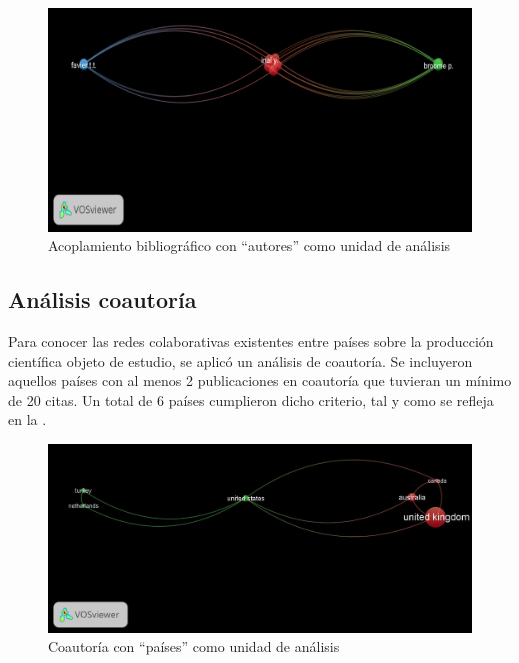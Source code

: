 \documentclass[spanish]{textolivre}
\begin{document}
\begin{figure}[h!]
\centering
\begin{minipage}{.9\textwidth}
 \includegraphics[width=\textwidth]{fig3.png}
 \caption{Acoplamiento bibliográfico con “autores” como unidad de análisis}
 \label{fig3}
\end{minipage}
\end{figure}


\subsection{Análisis coautoría}

Para conocer las redes colaborativas existentes entre países sobre la producción científica objeto de estudio, se aplicó un análisis de coautoría. Se incluyeron aquellos países con al menos 2 publicaciones en coautoría que tuvieran un mínimo de 20 citas. Un total de 6 países cumplieron dicho criterio, tal y como se refleja en la .

\begin{figure}[h!]
\centering
\begin{minipage}{.9\textwidth}
 \includegraphics[width=\textwidth]{fig4.jpg}
 \caption{Coautoría con “países” como unidad de análisis}
 \label{fig4}
\end{minipage}
\end{figure}
\end{document}
